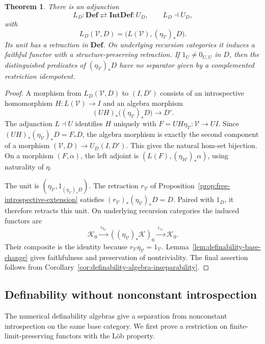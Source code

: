 \documentclass[11pt]{article}
\newtheorem{theorem}{Theorem}[section]
\theoremstyle{definition}
\theoremstyle{remark}
\begin{document}
\begin{theorem}\label{thm:relative-introspective-adjunction}
There is an adjunction
\[
 L_D:\mathbf{Def}\rightleftarrows\mathbf{IntDef}:U_D,
 \qquad L_D\dashv U_D,
\]
with
\[
 L_D(\mathscr V,D)=
 \bigl(L(\mathscr V),(\eta_{\mathscr V})_*D\bigr).
\]
Its unit has a retraction in $\mathbf{Def}$. On underlying
recursion categories it induces a faithful functor with a
structure-preserving retraction. If $1_U\ne0_{U,U}$ in $D$,
then the distinguished predicates of $(\eta_{\mathscr V})_*D$
have no separator given by a complemented restriction idempotent.
\end{theorem}
\begin{proof}
A morphism from $L_D(\mathscr V,D)$ to $(I,D')$ consists of an
introspective homomorphism $H:L(\mathscr V)\to I$ and an algebra
morphism
\[
 (UH)_*\bigl((\eta_{\mathscr V})_*D\bigr)\longrightarrow D'.
\]
The adjunction $L\dashv U$ identifies $H$ uniquely with
$F=UH\eta_{\mathscr V}:\mathscr V\to UI$. Since
$(UH)_*(\eta_{\mathscr V})_*D=F_*D$, the algebra morphism is
exactly the second component of a morphism
$(\mathscr V,D)\to U_D(I,D')$. This gives the natural hom-set
bijection. On a morphism $(F,\alpha)$, the left adjoint is
$(L(F),(\eta_{\mathscr W})_*\alpha)$, using naturality of $\eta$.

The unit is $(\eta_{\mathscr V},1_{(\eta_{\mathscr V})_*D})$.
The retraction $r_{\mathscr V}$ of
Proposition~\ref{prop:free-introspective-extension} satisfies
$(r_{\mathscr V})_*(\eta_{\mathscr V})_*D=D$. Paired with $1_D$,
it therefore retracts this unit. On underlying recursion
categories the induced functors are
\[
 \mathcal K_0
 \xrightarrow{\ \iota_{\eta_{\mathscr V}}\ }
 ((\eta_{\mathscr V})_*\mathcal K)_0
 \xrightarrow{\ \iota_{r_{\mathscr V}}\ }\mathcal K_0.
\]
Their composite is the identity because
$r_{\mathscr V}\eta_{\mathscr V}=1_{\mathscr V}$.
Lemma~\ref{lem:definability-base-change} gives faithfulness and
preservation of nontriviality. The final assertion follows from
Corollary~\ref{cor:definability-algebra-inseparability}.
\end{proof}

\subsection{Definability without nonconstant introspection}
\label{sec:introspection-separation}

The numerical definability algebras give a separation from
nonconstant introspection on the same base category. We first prove a
restriction on finite-limit-preserving functors with the
L\"ob property.
\end{document}
